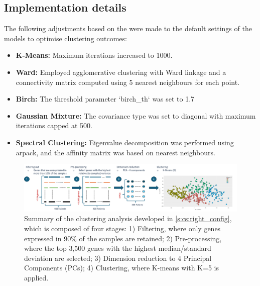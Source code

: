 \subsection*{Implementation details}
The following adjustments based on the \citet{Scikit-learn_undated-ax} were made to the default settings of the models to optimise clustering outcomes:
\begin{itemize}
    \item \textbf{K-Means:} Maximum iterations increased to 1000.
    \item \textbf{Ward:} Employed agglomerative clustering with Ward linkage and a connectivity matrix computed using 5 nearest neighbours for each point.
    \item \textbf{Birch:} The threshold parameter `birch\_th` was set to 1.7
    \item \textbf{Gaussian Mixture:} The covariance type was set to diagonal with maximum iterations capped at 500.
    \item \textbf{Spectral Clustering:} Eigenvalue decomposition was performed using arpack, and the affinity matrix was based on nearest neighbours.
\end{itemize}

\begin{figure}
    \centering
    \includegraphics[width=1.0\textwidth,height=1.0\textheight,keepaspectratio]{Sections/ClusteringAnalysis/Resources/clustering_pipeline.png}
    \caption{Summary of the clustering analysis developed in \cref{s:cs:right_config}, which is composed of four stages: 1) Filtering, where only genes expressed in 90\% of the samples are retained; 2) Pre-processing, where the top 3,500 genes with the highest median/standard deviation are selected; 3) Dimension reduction to 4 Principal Components (PCs); 4) Clustering, where K-means with K=5 is applied.}
    \label{fig:cs:clustering_pipeline}
\end{figure}
